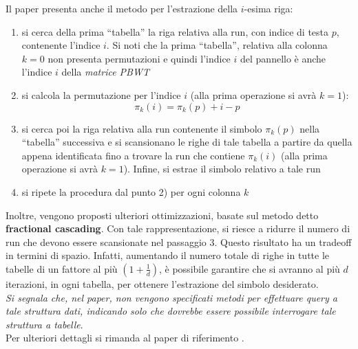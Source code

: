 Il paper presenta anche il metodo per l'estrazione della $i$-esima riga:
\begin{enumerate}
  \item si cerca della prima ``tabella'' la riga relativa alla run, con indice
  di testa $p$, contenente
  l'indice $i$. Si noti che la prima ``tabella'', relativa alla colonna $k=0$
  non presenta permutazioni e quindi 
  l'indice $i$ del pannello è anche l'indice $i$ della \textit{matrice PBWT}
  \item si calcola la permutazione per l'indice $i$ (alla prima operazione
  si avrà $k=1$):
  \begin{equation}
    \label{eq:pbwttrick2}
    \pi_k(i)=\pi_k(p)+i-p
  \end{equation}
  \item si cerca poi la riga relativa alla run contenente il simbolo $\pi_k(p)$
  nella ``tabella'' successiva e si scansionano le righe di tale tabella a
  partire da quella appena identificata fino a trovare la run che contiene
  $\pi_k(i)$ (alla prima
  operazione si avrà $k=1$). Infine, si estrae il simbolo relativo a tale run 
  \item si ripete la procedura dal punto 2) per ogni colonna $k$
\end{enumerate}
Inoltre,
vengono proposti ulteriori ottimizzazioni, basate sul metodo detto
\textbf{fractional cascading}. Con tale rappresentazione, si riesce a ridurre il
numero di run che devono essere scansionate nel passaggio 3. Questo risultato
ha un tradeoff in termini di spazio. Infatti, aumentando il numero totale di
righe in tutte le tabelle di un fattore al più $\left(1+\frac{1}{d}\right)$, è
possibile garantire che si avranno al più $d$ iterazioni, in ogni tabella, per
ottenere l'estrazione del simbolo desiderato.\\
\textit{Si segnala che, nel paper, non vengono specificati metodi per
effettuare query a 
tale struttura dati, indicando solo che dovrebbe essere possibile interrogare
tale struttura a tabelle}.\\
Per ulteriori dettagli si rimanda al paper di riferimento \cite{tricks}.
